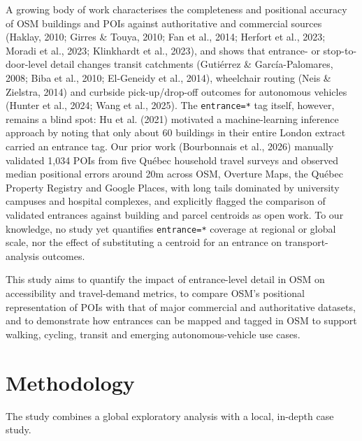 \documentclass{article}
\begin{document}
A growing body of work characterises the completeness and positional
accuracy of OSM buildings and POIs against authoritative and
commercial sources (Haklay, 2010; Girres \& Touya, 2010; Fan et al.,
2014; Herfort et al., 2023; Moradi et al., 2023; Klinkhardt et al.,
2023), and shows that entrance- or stop-to-door-level detail changes
transit catchments (Gutiérrez \& García-Palomares, 2008; Biba et al.,
2010; El-Geneidy et al., 2014), wheelchair routing (Neis \& Zielstra,
2014) and curbside pick-up/drop-off outcomes for autonomous vehicles
(Hunter et al., 2024; Wang et al., 2025). The \texttt{entrance=*}
tag itself, however, remains a blind spot: Hu et al. (2021) motivated
a machine-learning inference approach by noting that only about 60
buildings in their entire London extract carried an entrance tag.
Our prior work (Bourbonnais et al., 2026) manually validated 1{,}034
POIs from five Québec household travel surveys and observed median
positional errors around 20m across OSM, Overture Maps, the Québec
Property Registry and Google Places, with long tails dominated by
university campuses and hospital complexes, and explicitly flagged
the comparison of validated entrances against building and parcel
centroids as open work. To our knowledge, no study yet quantifies
\texttt{entrance=*} coverage at regional or global scale, nor the
effect of substituting a centroid for an entrance on
transport-analysis outcomes.

This study aims to quantify the impact of entrance-level detail in
OSM on accessibility and travel-demand metrics, to compare OSM's
positional representation of POIs with that of major commercial and
authoritative datasets, and to demonstrate how entrances can be
mapped and tagged in OSM to support walking, cycling, transit and
emerging autonomous-vehicle use cases.

\section{Methodology}

The study combines a global exploratory analysis with a local,
in-depth case study.
\end{document}
